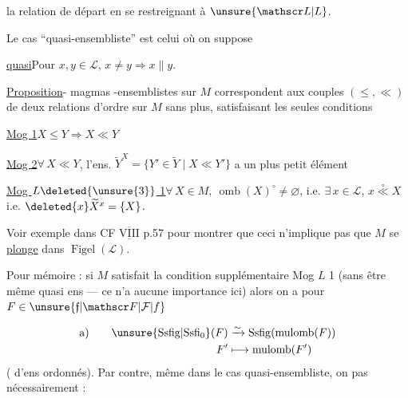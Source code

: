 
la relation de départ en se restreignant à $\unsure{\mathscr L|L}$.

Le cas ``quasi-ensembliste'' est celui où on suppose

\uline{ quasi}\quad Pour $x,y\in\mathscr L$, $x\neq y\Longrightarrow x\parallel y$.

\uline{Proposition}-\uline{}   magmas -ensemblistes sur $M$ correspondent aux couples $(\leq,\ll)$ de deux relations d'ordre sur $M$ sans plus, satisfaisant les seules conditions

\uline{Mog 1}\quad $X\leq Y\Longrightarrow X\ll Y$

\uline{Mog 2}\quad $\forall\,X\ll Y$, l'ens. $\widetilde Y^X=\{Y'\in\widetilde Y\mid X\ll Y'\}$ a un plus petit élément

\uline{Mog $L\deleted{\unsure{3}}$ 1}\quad $\forall\,X\in M,\ \operatorname{omb}(X)^\circ\neq\varnothing$, i.e. $\exists\,x\in\mathscr L$,  $x\overset{\circ}{\ll}X$ i.e. $\deleted{x}\widetilde X^x=\{X\}$.

Voir exemple dans CF $\underline{\overline{\mathrm{VIII}}}$ p.57 pour montrer que ceci n'implique pas que $M$ se \uline{plonge} dans $\operatorname{Figel}(\mathscr L)$.


Pour mémoire : si $M$ satisfait la condition supplémentaire Mog $L$ 1 (sans être même quasi ens --- ce n'a aucune importance  ici) alors on a pour $F\in\unsure{\mathfrak f|\mathscr F|\mathcal F|f}$

\[
\begin{aligned}
\text{a)}\qquad\unsure{\mathrm{Ssfig}|\mathrm{Ssfi}_0}(F)&\xrightarrow{\sim}\mathrm{Ssfig}(\operatorname{mulomb}(F))\\
F'&\longmapsto\operatorname{mulomb}(F')
\end{aligned}
\]
( d'ens ordonnés). Par contre, même dans le cas quasi-ensembliste, on  pas nécessairement :

